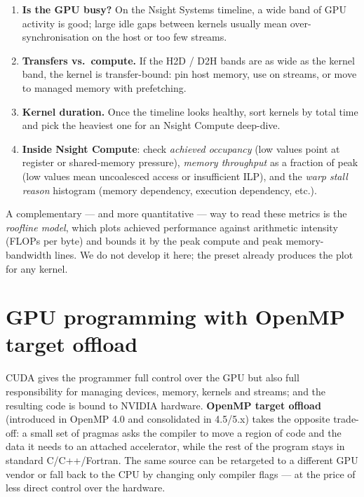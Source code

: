 \begin{tipsblock}
\begin{enumerate}
    \item \textbf{Is the GPU busy?} On the Nsight Systems timeline, a wide band of GPU activity is good; large idle gaps between kernels usually mean over-synchronisation on the host or too few streams.
    \item \textbf{Transfers vs.\ compute.} If the H2D / D2H bands are as wide as the kernel band, the kernel is transfer-bound: pin host memory, use  on streams, or move to managed memory with prefetching.
    \item \textbf{Kernel duration.} Once the timeline looks healthy, sort kernels by total time and pick the heaviest one for an Nsight Compute deep-dive.
    \item \textbf{Inside Nsight Compute}: check \emph{achieved occupancy} (low values point at register or shared-memory pressure), \emph{memory throughput} as a fraction of peak (low values mean uncoalesced access or insufficient ILP), and the \emph{warp stall reason} histogram (memory dependency, execution dependency, etc.).
\end{enumerate}
\end{tipsblock}

\begin{observationblock}
A complementary --- and more quantitative --- way to read these metrics is the \textit{roofline model}, which plots achieved performance against arithmetic intensity (FLOPs per byte) and bounds it by the peak compute and peak memory-bandwidth lines. We do not develop it here; the  preset already produces the plot for any kernel.
\end{observationblock}

\section{GPU programming with OpenMP target offload}

CUDA gives the programmer full control over the GPU but also full responsibility for managing devices, memory, kernels and streams; and the resulting code is bound to NVIDIA hardware. \textbf{OpenMP target offload} (introduced in OpenMP 4.0 and consolidated in 4.5/5.x) takes the opposite trade-off: a small set of pragmas asks the compiler to move a region of code and the data it needs to an attached accelerator, while the rest of the program stays in standard C/C++/Fortran. The same source can be retargeted to a different GPU vendor or fall back to the CPU by changing only compiler flags --- at the price of less direct control over the hardware.

